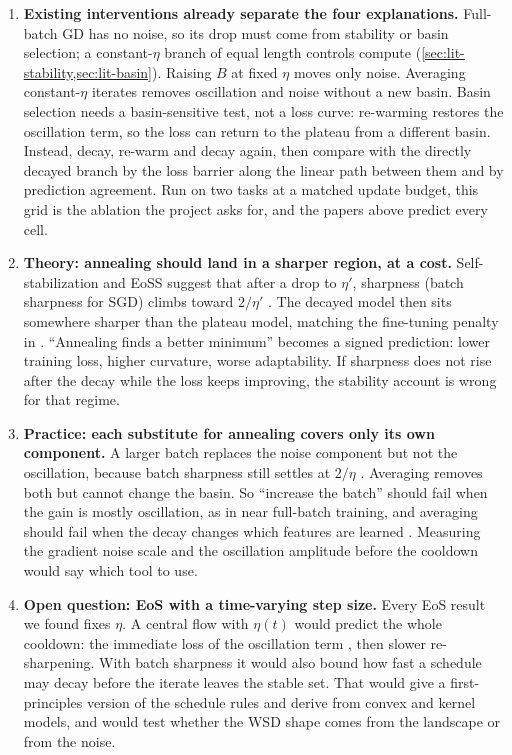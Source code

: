 \documentclass[10pt]{article}
\begin{document}
\begin{enumerate}[leftmargin=1.3em,itemsep=4pt]
\item \textbf{Existing interventions already separate the four explanations.} Full-batch GD has no
noise, so its drop must come from stability or basin selection; a constant-$\eta$ branch of equal
length controls compute (\cref{sec:lit-stability,sec:lit-basin}). Raising $B$ at fixed $\eta$
\citep{smith2018dontdecay} moves only noise. Averaging constant-$\eta$ iterates
\citep{hagele2024scaling,defazio2024schedulefree} removes oscillation and noise without a new basin.
Basin selection needs a basin-sensitive test, not a loss curve: re-warming restores the oscillation
term, so the loss can return to the plateau from a different basin. Instead, decay, re-warm and decay
again, then compare with the directly decayed branch by the loss barrier along the linear path
between them \citep{frankle2020lmc} and by prediction agreement. Run on two tasks at a matched update budget, this grid is the ablation the project asks for,
and the papers above predict every cell.

\item \textbf{Theory: annealing should land in a sharper region, at a cost.} Self-stabilization and
EoSS suggest that after a drop to $\eta'$, sharpness (batch sharpness for SGD) climbs toward
$2/\eta'$ \citep{damian2023selfstab,andreyev2024eoss}. The decayed model then sits somewhere sharper
than the plateau model, matching the fine-tuning penalty in \citet{yano2026nodecay}. ``Annealing
finds a better minimum'' becomes a signed prediction: lower training loss, higher curvature, worse
adaptability. If sharpness does not rise after the decay while the loss keeps improving, the
stability account is wrong for that regime.

\item \textbf{Practice: each substitute for annealing covers only its own component.} A larger batch
replaces the noise component but not the oscillation, because batch sharpness still settles at
$2/\eta$ \citep{andreyev2024eoss}. Averaging removes both but cannot change the basin. So ``increase
the batch'' should fail when the gain is mostly oscillation, as in near full-batch training, and
averaging should fail when the decay changes which features are learned
\citep{andriushchenko2023sparse}. Measuring the gradient noise scale and the oscillation amplitude
before the cooldown would say which tool to use.

\item \textbf{Open question: EoS with a time-varying step size.} Every EoS result we found fixes
$\eta$. A central flow with $\eta(t)$ would predict the whole cooldown: the immediate loss of the
oscillation term \citep{cohen2025central}, then slower re-sharpening. With batch sharpness it would
also bound how fast a schedule may decay before the iterate leaves the stable set. That would give a
first-principles version of the schedule rules \citet{schaipp2025convex} and \citet{li2026fsl} derive
from convex and kernel models, and would test whether the WSD shape comes from the landscape or from
the noise.
\end{enumerate}
\end{document}
